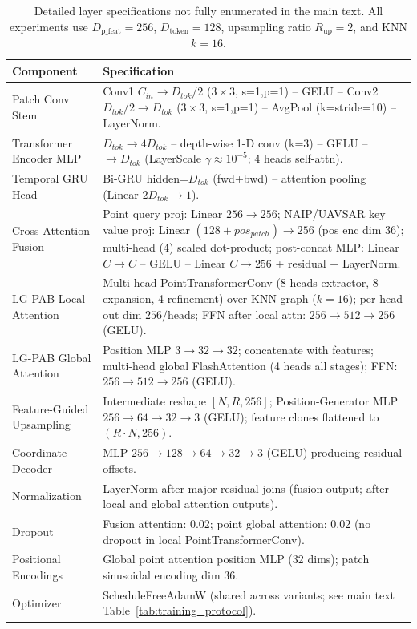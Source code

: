 \documentclass[remotesensing,article,accept,pdftex,moreauthors]{Definitions/mdpi}
\begin{document}
\begin{table}[H]
  \centering
  \caption{Detailed layer specifications not fully enumerated in the main text. All experiments use $D_{\text{p\_feat}}=256$, $D_{\text{token}}=128$, upsampling ratio $R_{\text{up}}=2$, and KNN $k=16$.}
  \label{tab:layer_specs}
  \small
  \begin{tabular}{p{3.2cm} p{10.8cm}}
    \toprule
    Component & Specification \\
    \midrule
    Patch Conv Stem & Conv1 $C_{in}\rightarrow D_{tok}/2$ ($3\times3$, s=1,p=1) – GELU – Conv2 $D_{tok}/2\rightarrow D_{tok}$ ($3\times3$, s=1,p=1) – AvgPool (k=stride=10) – LayerNorm. \\
    \addlinespace
    Transformer Encoder MLP & $D_{tok} \rightarrow 4D_{tok}$ – depth-wise 1-D conv (k=3) – GELU – $\rightarrow D_{tok}$ (LayerScale $\gamma\approx10^{-5}$; 4 heads self-attn). \\
    \addlinespace
    Temporal GRU Head & Bi-GRU hidden=$D_{tok}$ (fwd+bwd) – attention pooling (Linear $2D_{tok}\rightarrow1$). \\
    \addlinespace
    Cross-Attention Fusion & Point query proj: Linear $256\rightarrow256$; NAIP/UAVSAR key \/ value proj: Linear $(128+pos_{patch})\rightarrow256$ (pos enc dim 36); multi-head (4) scaled dot-product; post-concat MLP: Linear $C\rightarrow C$ – GELU – Linear $C\rightarrow256$ + residual + LayerNorm. \\
    \addlinespace
    LG-PAB Local Attention & Multi-head PointTransformerConv (8 heads extractor, 8 expansion, 4 refinement) over KNN graph ($k=16$); per-head out dim $256/\text{heads}$; FFN after local attn: $256\rightarrow512\rightarrow256$ (GELU). \\
    \addlinespace
    LG-PAB Global Attention & Position MLP $3\rightarrow32\rightarrow32$; concatenate with features; multi-head global FlashAttention (4 heads all stages); FFN: $256\rightarrow512\rightarrow256$ (GELU). \\
    \addlinespace
    Feature-Guided Upsampling & Intermediate reshape $[N,R,256]$; Position-Generator MLP $256\rightarrow64\rightarrow32\rightarrow3$ (GELU); feature clones flattened to $(R\cdot N,256)$. \\
    \addlinespace
    Coordinate Decoder & MLP $256\rightarrow128\rightarrow64\rightarrow32\rightarrow3$ (GELU) producing residual offsets. \\
    \addlinespace
    Normalization & LayerNorm after major residual joins (fusion output; after local and global attention outputs). \\
    \addlinespace
    Dropout & Fusion attention: 0.02; point global attention: 0.02 (no dropout in local PointTransformerConv). \\
    \addlinespace
    Positional Encodings & Global point attention position MLP (32 dims); patch sinusoidal encoding dim 36. \\
    \addlinespace
    Optimizer & ScheduleFreeAdamW (shared across variants; see main text Table~\ref{tab:training_protocol}). \\
    \bottomrule
  \end{tabular}
\end{table}
\end{document}
